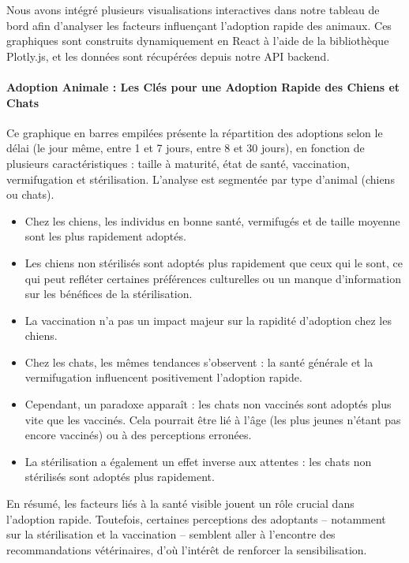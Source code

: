 \documentclass[a4paper,12pt]{article}
\begin{document}
Nous avons intégré plusieurs visualisations interactives dans notre tableau de bord afin d’analyser les facteurs influençant l’adoption rapide des animaux. Ces graphiques sont construits dynamiquement en React à l’aide de la bibliothèque Plotly.js, et les données sont récupérées depuis notre API backend.


\paragraph{Adoption Animale : Les Clés pour une Adoption Rapide des Chiens et Chats}

Ce graphique en barres empilées présente la répartition des adoptions selon le délai (le jour même, entre 1 et 7 jours, entre 8 et 30 jours), en fonction de plusieurs caractéristiques : taille à maturité, état de santé, vaccination, vermifugation et stérilisation. L'analyse est segmentée par type d’animal (chiens ou chats).

\begin{itemize}
    \item Chez les chiens, les individus en bonne santé, vermifugés et de taille moyenne sont les plus rapidement adoptés.
    \item Les chiens non stérilisés sont adoptés plus rapidement que ceux qui le sont, ce qui peut refléter certaines préférences culturelles ou un manque d'information sur les bénéfices de la stérilisation.
    \item La vaccination n’a pas un impact majeur sur la rapidité d’adoption chez les chiens.
    \item Chez les chats, les mêmes tendances s’observent : la santé générale et la vermifugation influencent positivement l’adoption rapide.
    \item Cependant, un paradoxe apparaît : les chats non vaccinés sont adoptés plus vite que les vaccinés. Cela pourrait être lié à l'âge (les plus jeunes n’étant pas encore vaccinés) ou à des perceptions erronées.
    \item La stérilisation a également un effet inverse aux attentes : les chats non stérilisés sont adoptés plus rapidement.
\end{itemize}

En résumé, les facteurs liés à la santé visible jouent un rôle crucial dans l’adoption rapide. Toutefois, certaines perceptions des adoptants – notamment sur la stérilisation et la vaccination – semblent aller à l’encontre des recommandations vétérinaires, d’où l’intérêt de renforcer la sensibilisation.
\end{document}
